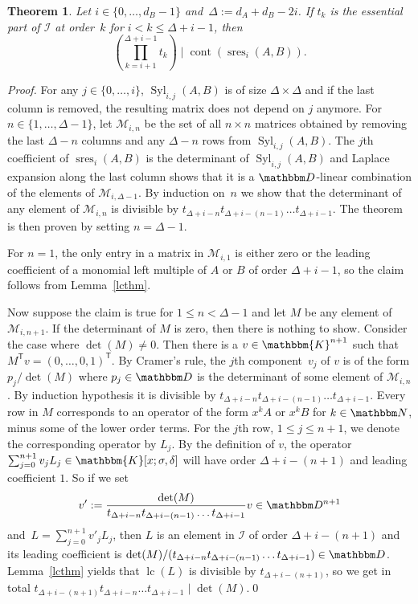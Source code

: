 \documentclass[3p,11pt,preprint]{elsarticle}
\newtheorem{theorem}{Theorem}
\let\set\mathbbm
\def\k{\set D}
\newcommand{\qk}{\set{K}}
\newcommand{\D}{x}
\newcommand{\qalg}{\qk[\D;\sigma,\delta]}
\newcommand{\lc}{\operatorname{lc}}
\newcommand{\syl}{\operatorname{Syl}}
\newcommand{\cont}{\operatorname{cont}}
\newcommand{\pres}{\operatorname{sres}}
\begin{document}
\begin{theorem}
\label{mainthm}
 Let $i\in\{0,\dots,d_B-1\}$ and~$\Delta:=d_A+d_B-2i$. If $t_k$ is the essential part of $\mathcal{I}$ at order~$k$ for $i< k\leq \Delta+i-1$, then
\[\left(\prod_{k=i+1}^{\Delta+i-1}t_k\right)\mid\cont(\pres_i(A,B)).\]
\end{theorem}

\begin{proof}
 For any $j\in\{0,\dots,i\}$, $\syl_{i,j}(A,B)$ is of size $\Delta\times\Delta $ and if the last column is removed, the resulting matrix does not depend on $j$ anymore. For $n\in \{1,\dots,\Delta-1\}$, let $\mathcal{M}_{i,n}$ be the set of all $n\times n$ matrices obtained by removing the last $\Delta-n$ columns and any $\Delta-n$ rows from $\syl_{i,j}(A,B)$. The $j$th coefficient of $\pres_i(A,B)$ is the determinant of $\syl_{i,j}(A,B)$ and Laplace expansion along the last column shows that it is a $\k$-linear combination of the elements of $\mathcal{M}_{i,\Delta-1}$. By induction on~$n$ we show that the determinant of any element of $\mathcal{M}_{i,n}$ is divisible by $t_{\Delta+i-n}t_{\Delta+i-(n-1)}\dots  t_{\Delta+i-1}$. The theorem is then proven by setting $n=\Delta-1$.

 For $n=1$, the only entry in a matrix in $\mathcal{M}_{i,1}$ is either zero or the leading coefficient of a monomial left multiple of $A$ or $B$ of order $\Delta+i-1$, so the claim follows from Lemma~\ref{lcthm}.

 Now suppose the claim is true for $1\leq n < \Delta-1$ and let $M$ be any element of $\mathcal{M}_{i,n+1}$. If the determinant of $M$ is zero, then there is nothing to show. Consider the case where $\det(M)\neq 0$. 
Then there is a $v\in\qk^{n+1}$ such that $M^\mathsf{T}v=(0,\dots,0,1)^\mathsf{T}$. By Cramer's rule, the $j$th component~$v_j$ of $v$ is of the form $p_j/\det(M)$ where $p_j\in\k$ is the determinant of some element of $\mathcal{M}_{i,n}$. By induction hypothesis it is divisible by $t_{\Delta+i-n}t_{\Delta+i-(n-1)}\dots t_{\Delta+i-1}$. 
 Every row in $M$ corresponds to an operator of the form $\D^kA$ or $\D^kB$ for $k\in\set N$, minus some of the lower order terms. For the $j$th row, $1\leq j\leq n+1$, we denote the corresponding operator by $L_j$. By the definition of $v$, the operator $\sum_{j=0}^{n+1}{v_jL_j}\in\qalg$ will have order $\Delta+i-(n+1)$ and leading coefficient $1$.
 So if we set \[v':=\frac{\det(M)}{t_{\Delta+i-n}t_{\Delta+i-(n-1)}\dots t_{\Delta+i-1}}v \in\k^{n+1}\] and~$L=\sum_{j=0}^{n+1}{v'_jL_j}$, then $L$ is an element in $\mathcal{I}$ of order $\Delta+i-(n+1)$ and its leading coefficient is $\det(M)/(t_{\Delta+i-n}t_{\Delta+i-(n-1)}\dots t_{\Delta+i-1})\in\k$. Lemma~\ref{lcthm} yields that $\lc(L)$ is divisible by $t_{\Delta+i-(n+1)}$, so we get in total $t_{\Delta+i-(n+1)}t_{\Delta+i-n}\dots t_{\Delta+i-1}\mid\det(M)$.\qed
\end{proof}
\end{document}
